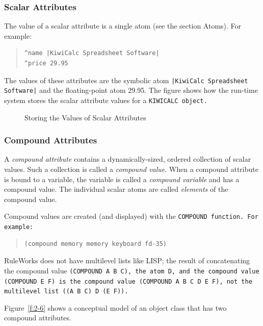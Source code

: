 \subsubsection{Scalar Attributes}

The value of a scalar attribute is a single atom (see the
section Atoms). For example:

\begin{quote}
\begin{verbatim}
^name |KiwiCalc Spreadsheet Software|
^price 29.95
\end{verbatim}
\end{quote}

The values of these attributes are the symbolic atom
\verb,|KiwiCalc Spreadsheet Software|, and the floating-point atom
29.95. The figure shows how the run-time system stores the
scalar attribute values for a \tt{KIWICALC} object.

\begin{figure}[h]
  \centering
  
  \caption{Storing the Values of Scalar Attributes}
  \label{f:2-5}
\end{figure}

\subsubsection*{Compound Attributes}

A \emph{compound attribute} contains a dynamically-sized, ordered
collection of scalar values. Such a collection is called a
\emph{compound value}. When a compound attribute is bound to a
variable, the variable is called a \emph{compound variable} and has a
compound value. The individual scalar atoms are called \emph{elements}
of the compound value.

Compound values are created (and displayed) with the \tt{COMPOUND}
function. For example:

\begin{quote}
\begin{verbatim}
(compound memory memory keyboard fd-35)
\end{verbatim}
\end{quote}

RuleWorks does not have multilevel lists like LISP; the
result of concatenating the compound value \tt{(COMPOUND A B C)},
the atom \tt{D}, and the compound value \tt{(COMPOUND E F)} is the
compound value \tt{(COMPOUND A B C D E F)}, not the multilevel
list \tt{((A B C) D (E F))}.

Figure~\ref{f:2-6} shows a conceptual model of an object class that
has two compound attributes.

